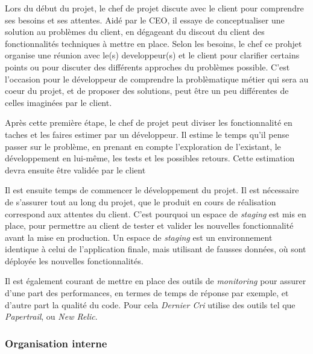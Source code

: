\documentclass[12pt,a4paper]{article}
\begin{document}
  Lors du début du projet, le chef de projet discute avec le client pour
  comprendre ses besoins et ses attentes. Aidé par le CEO, il essaye de
  conceptualiser une solution au problèmes du client, en dégageant du
  discout du client des fonctionnalités techniques à mettre en place.
  Selon les besoins, le chef ce prohjet organise une réunion avec le(s)
  developpeur(s) et le client pour clarifier certains points ou pour
  discuter des différents approches du problèmes possible. C'est
  l'occasion pour le développeur de comprendre la problèmatique métier qui
  sera au coeur du projet, et de proposer des solutions, peut être un peu
  différentes de celles imaginées par le client.

  \bigskip

  Après cette première étape, le chef de projet peut diviser les
  fonctionnalité en taches et les faires estimer par un développeur. Il
  estime le temps qu'il pense passer sur le problème, en prenant en compte
  l'exploration de l'existant, le développement en lui-même, les tests et
  les possibles retours. Cette estimation devra ensuite être validée par
  le client

  \bigskip

  Il est ensuite temps de commencer le développement du projet. Il est
  nécessaire de s'assurer tout au long du projet, que le produit en cours
  de réalisation correspond aux attentes du client. C'est pourquoi un
  espace de \emph{staging} est mis en place, pour permettre au client de
  tester et valider les nouvelles fonctionnalité avant la mise en
  production. Un espace de \emph{staging} est un environnement identique à
  celui de l'application finale, mais utilisant de fausses données, où
  sont déployée les nouvelles fonctionnalités.

  \bigskip

  Il est également courant de mettre en place des outils de
  \emph{monitoring} pour assurer d'une part des performances, en termes de
  temps de réponse par exemple, et d'autre part la qualité du code. Pour
  cela \emph{Dernier Cri} utilise des outils tel que \emph{Papertrail}, ou
  \emph{New Relic}.

  \bigskip

  \subsubsection{Organisation interne}\label{organisation-interne}

  \bigskip
\end{document}
